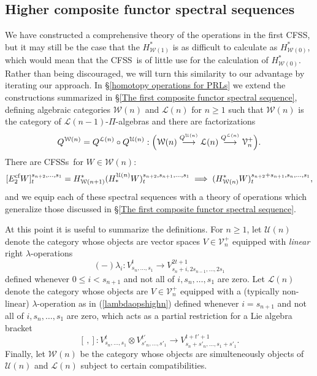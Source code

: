 \documentclass[11pt]{amsart} \renewcommand{\baselinestretch}{1.2}
\theoremstyle{plain}
\numberwithin{equation}{section} %
\theoremstyle{plain}
\numberwithin{equation}{chapter} %
\newcommand{\DASH}{\mathrm{-}}
\renewcommand{\to}{\longrightarrow}
\newcommand{\calW}{\mathcal{W}}
\newcommand{\calU}{\mathcal{U}}
\newcommand{\calV}{\mathcal{V}}
\newcommand{\calw}{\mathcal{W}}
\newcommand{\calu}{\mathcal{U}}
\newcommand{\call}{\mathcal{L}}
\newcommand{\vect}[2]{\calV^{#1}_{#2}}
\newcommand{\E}[5]{[E^{#1}_{#2}#3]^{#4}_{#5}}
\newcommand{\CFSS}{CFSS}
\newcommand{\CFSSs}{CFSSs}
\newcommand{\SubsectionOrSection}[1]{\subsection{#1}}
\begin{document}
\begin{Introduction}
\SubsectionOrSection{Higher composite functor spectral sequences}\label{Higher composite functor spectral sequences}
We have constructed a comprehensive theory of the operations in the first \CFSS, but it may still be the case that the $H^*_{\calw(1)}$ is as difficult to calculate as $H^*_{\calw(0)}$, which would mean that the \CFSS\ is of little use for the calculation of $H^*_{\calw(0)}$. Rather than being discouraged, we will turn this similarity to our advantage by iterating our approach. %
 In \S\ref{homotopy operations for PRLs} we extend the constructions summarized in \S\ref{The first composite functor spectral sequence}, defining algebraic categories $\calw(n)$ and $\call(n)$ for $n\geq1$ such that $\calw(n)$ is the category of $\call(n-1)$-$\Pi$-algebras and there are factorizations 
\[Q^{\calw(n)}=Q^{\call(n)}\circ Q^{\calu(n)}:\Bigl(\calw(n)\overset{Q^{\calu(n)}}{\to}\call(n)\overset{Q^{\call(n)}}{\to}\vect{+}{n}\Bigr).\]
There are \CFSSs\ for $W\in\calw(n)$:
\[\E{\textup{cf}}{2}{W}{s_{n+2},\ldots,s_1}{t}=H^*_{\calw(n+1)}(H_*^{\calu(n)}W)^{s_{n+2},s_{n+1},\ldots,s_1}_t\implies (H^*_{\calw(n)} W)_t^{s_{n+2}+s_{n+1},s_n,\ldots,s_1},\]
and we equip each of these spectral sequences with a theory of operations which generalize those discussed in \S\ref{The first composite functor spectral sequence}. 

At this point it is useful to summarize the definitions. For $n\geq1$,
let $\calU(n)$ denote the category whose objects are vector spaces $V\in \vect{+}{n}$ equipped with  \emph{linear} right $\lambda$-operations
\begin{equation}\label{lambdaopshighn}
(\DASH)\lambda_i:V_{s_{n},\ldots,s_1}^t\to V_{s_{n}+i,2s_{n-1},\ldots,2s_1}^{2t+1}
\end{equation}
defined whenever $0\leq i< s_{n+1}$ and not all of $i,s_{n},\ldots,s_{1}$ are zero. Let $\call(n)$ denote the category whose objects are $V\in \vect{+}{n}$ equipped with a (typically non-linear) $\lambda$-operation as in (\ref{lambdaopshighn}) defined whenever $i= s_{n+1}$ and not all of $i,s_{n},\ldots,s_{1}$ are zero, which acts as a partial restriction for a Lie algebra bracket
\[[\,,]:V^{t}_{s_n,\ldots,s_1}\otimes V^{t'}_{s'_n,\ldots,s'_1}\to V^{t+t'+1}_{s_n+s'_n,\ldots,s_1+s'_1}.\]
Finally, let $\calw(n)$ be the category whose objects are simulteneously objects of $\calU(n)$ and $\call(n)$ subject to certain compatibilities.


\end{Introduction}
\end{document}
